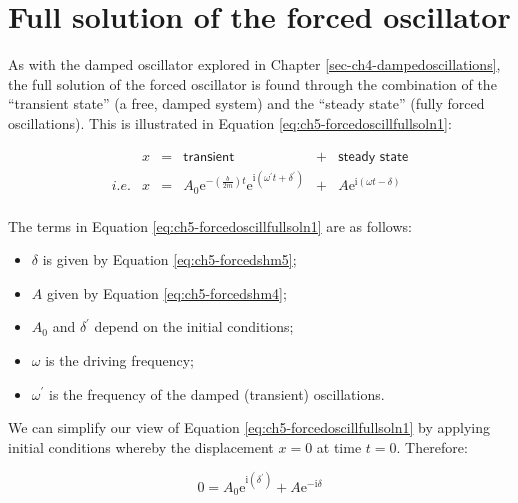 \documentclass[
]{book}
\providecommand{\tightlist}{%
  \setlength{\itemsep}{0pt}\setlength{\parskip}{0pt}}
\begin{document}
\hypertarget{sec-ch5-fullsolutionforcedoscillator}{%
\section{Full solution of the forced oscillator}\label{sec-ch5-fullsolutionforcedoscillator}}

As with the damped oscillator explored in Chapter \ref{sec-ch4-dampedoscillations}, the full solution of the forced oscillator is found through the combination of the ``transient state'' (a free, damped system) and the ``steady state'' (fully forced oscillations). This is illustrated in Equation \eqref{eq:ch5-forcedoscillfullsoln1}:

\begin{equation}
\begin{array}{lrcccc}
& x &=& \textsf{transient} &+&\textsf{steady state} \\
\textit{i.e.} & x&=& A_0 \mathrm{e}^{- \left(\frac{b}{2m}\right)t} \mathrm{e}^{\mathrm{i} \left( \omega^\prime t + \delta^\prime \right)} &+&  A \mathrm{e}^{\mathrm{i}\left(\omega t - \delta \right)} \\
\end{array}
\label{eq:ch5-forcedoscillfullsoln1}
\end{equation}

The terms in Equation \eqref{eq:ch5-forcedoscillfullsoln1} are as follows:

\begin{itemize}
\tightlist
\item
  \(\delta\) is given by Equation \eqref{eq:ch5-forcedshm5};
\item
  \(A\) given by Equation \eqref{eq:ch5-forcedshm4};
\item
  \(A_0\) and \(\delta^\prime\) depend on the initial conditions;
\item
  \(\omega\) is the driving frequency;
\item
  \(\omega^\prime\) is the frequency of the damped (transient) oscillations.
\end{itemize}

We can simplify our view of Equation \eqref{eq:ch5-forcedoscillfullsoln1} by applying initial conditions whereby the displacement \(x = 0\) at time \(t = 0\). Therefore:

\begin{equation}
0 = A_0 \mathrm{e}^{\mathrm{i} \left( \delta^\prime \right)} + A \mathrm{e}^{-\mathrm{i}\delta}
\end{equation}
\end{document}
